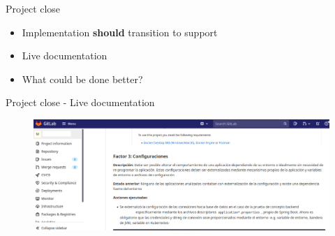 \documentclass[aspectratio=169]{beamer}
\begin{document}
\begin{frame}{Project close}
\begin{itemize}
\item Implementation \textbf{should} transition to support
\item Live documentation
\item What could be done better?
\end{itemize}
\end{frame}

\begin{frame}{Project close - Live documentation}
\begin{figure}
	\centering
	\includegraphics[width=\linewidth]{Images/docviva}
\end{figure}
\end{frame}
\end{document}

